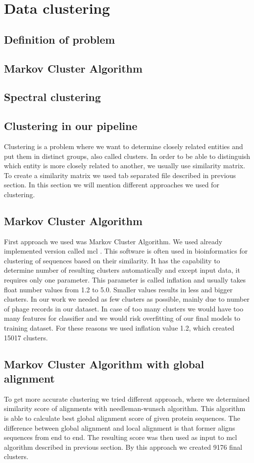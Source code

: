 \section{Data clustering}
\subsection{Definition of problem}
\subsection{Markov Cluster Algorithm}
\subsection{Spectral clustering}
\subsection{Clustering in our pipeline}
Clustering is a problem where we want to determine closely related entities and put them in distinct groups, also called clusters.
In order to be able to distinguish which entity is more closely related to another, we usually use similarity matrix.
To create a similarity matrix we used tab separated file described in previous section.
In this section we will mention different approaches we used for clustering. 
\subsection{Markov Cluster Algorithm}
First approach we used was Markov Cluster Algorithm. 
We used already implemented version called mcl \cite{mcl}.
This software is often used in bioinformatics for clustering of sequences based on their similarity.
It has the capability to determine number of resulting clusters automatically and except input data, it requires only one parameter.
This parameter is called inflation and usually takes float number values from 1.2 to 5.0.
Smaller values results in less and bigger clusters.
In our work we needed as few clusters as possible, mainly due to number of phage records in our dataset.
In case of too many clusters we would have too many features for classifier and we would risk overfitting of our final models to training dataset.
For these reasons we used inflation value 1.2, which created 15017 clusters.

\subsection{Markov Cluster Algorithm with global alignment}
To get more accurate clustering we tried different approach, where we determined similarity score of alignments with needleman-wunsch algorithm. \cite{needleman-wunsch}
This algorithm is able to calculate best global alignment score of given protein sequences.
The difference between global alignment and local alignment is that former aligns sequences from end to end.
The resulting score was then used as input to mcl algorithm described in previous section.
By this approach we created 9176 final clusters.

